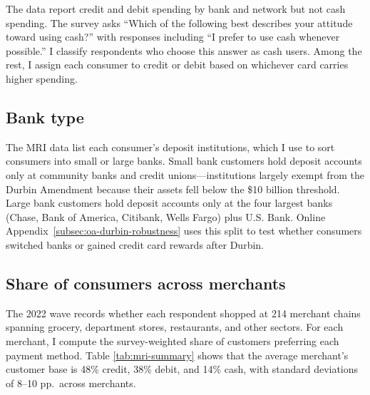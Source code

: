 \documentclass[main.tex]{subfiles}
\begin{document}
The data report credit and debit spending by bank and network but not cash spending.
The survey asks ``Which of the following best describes your attitude toward using cash?'' with responses including ``I prefer to use cash whenever possible.'' I classify respondents who choose this answer as cash users.
Among the rest, I assign each consumer to credit or debit based on whichever card carries higher spending.

\subsection{Bank type}\label{subsubsec:oa-mri-bank-type}

The MRI data list each consumer's deposit institutions, which I use to sort consumers into small or large banks.
Small bank customers hold deposit accounts only at community banks and credit unions---institutions largely exempt from the Durbin Amendment because their assets fell below the \$10 billion threshold.
Large bank customers hold deposit accounts only at the four largest banks (Chase, Bank of America, Citibank, Wells Fargo) plus U.S. Bank.
Online Appendix~\ref{subsec:oa-durbin-robustness} uses this split to test whether consumers switched banks or gained credit card rewards after Durbin.

\subsection{Share of consumers across merchants}

The 2022 wave records whether each respondent shopped at 214 merchant chains spanning grocery, department stores, restaurants, and other sectors.
For each merchant, I compute the survey-weighted share of customers preferring each payment method.
Table \ref{tab:mri-summary} shows that the average merchant's customer base is 48\% credit, 38\% debit, and 14\% cash, with standard deviations of 8--10 pp.\ across merchants.
\end{document}
